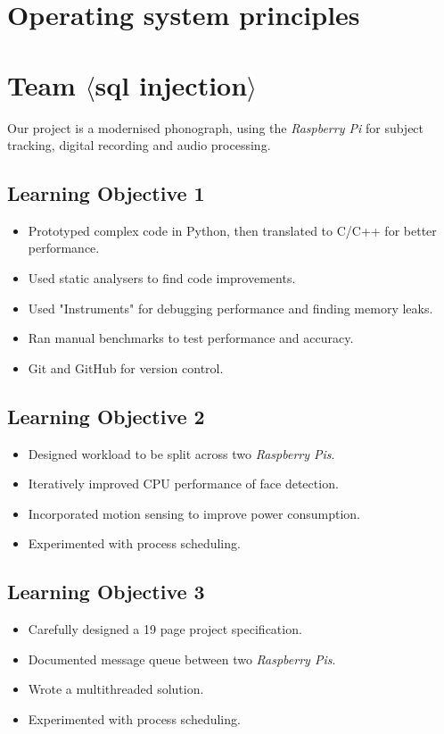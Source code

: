 \documentclass[11pt,a4paper]{article}
\newcommand{\rpi}{\textit{Raspberry Pi\textsuperscript{\textregistered}}}
\newcommand{\rpis}{\textit{Raspberry Pi\textsuperscript{\textregistered}s}}
\begin{document}
\section*{Operating system principles}

\section*{Team $\langle$sql injection$\rangle$}

Our project is a modernised phonograph, using the \rpi\xspace for subject tracking, digital recording and audio processing.

\subsection*{Learning Objective 1}


\begin{itemize}
  \item Prototyped complex code in Python, then translated to C/C++ for better performance.
  \item Used static analysers to find code improvements.
  \item Used "Instruments" for debugging performance and finding memory leaks.
  \item Ran manual benchmarks to test performance and accuracy.
  \item Git and GitHub for version control.
\end{itemize}

\subsection*{Learning Objective 2}

\begin{itemize}
  \item Designed workload to be split across two \rpis.
  \item Iteratively improved CPU performance of face detection.
  \item Incorporated motion sensing to improve power consumption.
  \item Experimented with process scheduling.
\end{itemize}

\subsection*{Learning Objective 3}

\begin{itemize}
  \item Carefully designed a 19 page project specification.
  \item Documented message queue between two \rpis.
  \item Wrote a multithreaded solution.
  \item Experimented with process scheduling.
\end{itemize}
\end{document}
